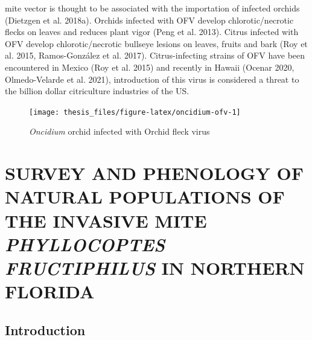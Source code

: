 \documentclass[12pt,final,CPage]{ufthesis}
\begin{document}
{mite vector is thought to be associated with the importation of infected orchids (Dietzgen et al. 2018a). Orchids infected with OFV develop chlorotic/necrotic flecks on leaves and reduces plant vigor (Peng et al. 2013). Citrus infected with OFV develop chlorotic/necrotic bullseye lesions on leaves, fruits and bark (Roy et al. 2015, Ramos-González et al. 2017). Citrus-infecting strains of OFV have been encountered in Mexico (Roy et al. 2015) and recently in Hawaii (Ocenar 2020, Olmedo-Velarde et al. 2021), introduction of this virus is considered a threat to the billion dollar citriculture industries of the US.
  \begin{figure}

  {\centering \texttt{[image: thesis\_files/figure-latex/oncidium-ofv-1]} 

  }

  \caption{\textit{Oncidium} orchid infected with Orchid fleck virus}\label{fig:oncidium-ofv}
  \end{figure}
  \hypertarget{survey-pheno}{%
  \chapter{\texorpdfstring{SURVEY AND PHENOLOGY OF NATURAL POPULATIONS OF THE INVASIVE MITE \emph{PHYLLOCOPTES FRUCTIPHILUS} IN NORTHERN FLORIDA}{SURVEY AND PHENOLOGY OF NATURAL POPULATIONS OF THE INVASIVE MITE PHYLLOCOPTES FRUCTIPHILUS IN NORTHERN FLORIDA}}\label{survey-pheno}}

  \hypertarget{intro-survey-pheno}{%
  \section{Introduction}\label{intro-survey-pheno}}

}
\end{document}
